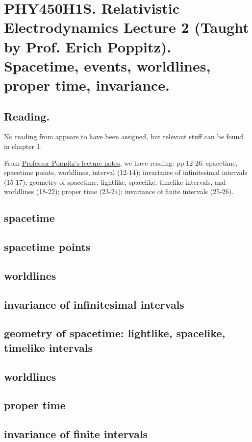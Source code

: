 
%

\chapter{PHY450H1S.  Relativistic Electrodynamics Lecture 2 (Taught by Prof. Erich Poppitz).  Spacetime, events, worldlines, proper time, invariance.}
\label{chap:relativisticElectrodynamicsL2}
{}
\date{Jan 12, 2011}

\beginArtNoToc

\section{Reading.}

No reading from \cite{landau1980classical} appears to have been assigned, but relevant stuff can be found in chapter 1.

From \href{http://www.physics.utoronto.ca/~poppitz/e-poppitz/PHY450_files/RelEM12-26.pdf}{Professor Poppitz's lecture notes}, we have reading: pp.12-26: spacetime, spacetime points, worldlines, interval (12-14); invariance of infinitesimal intervals (15-17);  geometry of spacetime, lightlike, spacelike, timelike intervals, and worldlines (18-22); proper time (23-24); invariance of finite intervals (25-26).

\section{spacetime}

\section{spacetime points}

\section{worldlines}

\section{invariance of infinitesimal intervals}

\section{geometry of spacetime: lightlike, spacelike, timelike intervals}

\section{worldlines}

\section{proper time}

\section{invariance of finite intervals}


\EndArticle

